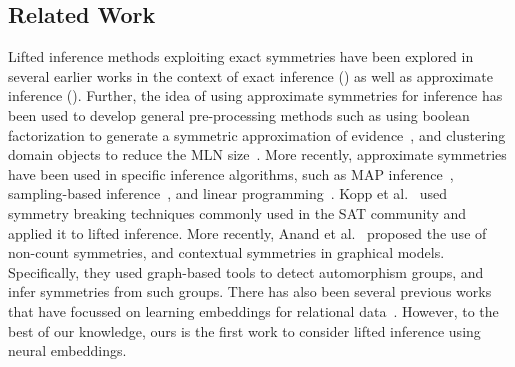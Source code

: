 \subsection{Related Work}

Lifted inference methods exploiting exact symmetries have been explored in several earlier works in the context of exact inference (\cite{poole03,braz07,gogate&domingos11b,broeck&al11}) as well as approximate inference (\cite{singla&domingos08,niepert12,venugopal&gogate12}). Further, the idea of using approximate symmetries for inference has been used to develop general pre-processing methods such as using boolean factorization to generate a symmetric approximation of evidence~\cite{broeck&darwiche13}, and clustering domain objects to reduce the MLN size~\cite{venugopal&gogate14}. More recently, approximate symmetries have been used in specific inference algorithms, such as MAP inference~\cite{sarkhel&al15}, sampling-based inference~\cite{broeck&niepert15}, and linear programming~\cite{kersting&al17}. Kopp et al.~\cite{kopp&al15} used symmetry breaking techniques commonly used in the SAT community and applied it to lifted inference. More recently, Anand et al. ~\cite{anand&al16,anand&al17}proposed the use of non-count symmetries, and contextual symmetries in graphical models. Specifically, they used graph-based tools to detect automorphism groups, and infer symmetries from such groups. There has also been several previous works that have focussed on learning embeddings for relational data~\cite{bordes&al11}. However, to the best of our knowledge, ours is the first work to consider lifted inference using neural embeddings.